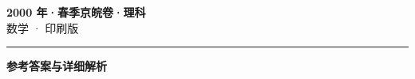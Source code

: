 \documentclass[zihao=5, a4paper]{ctexart}
\begin{document}
\begin{center}
  {\Large\bfseries 2000 年·春季京皖卷·理科}\\[4pt]
  {\large 数学 · 印刷版}
\end{center}
\medskip
{}

\par\bigskip\hrule\bigskip
{}
\begin{center}{\large\bfseries 参考答案与详细解析}\end{center}
\smallskip

\end{document}
